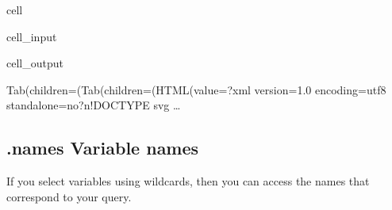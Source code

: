 \documentclass[letterpaper,10pt,english]{jupyterBook}
\begin{document}
\begin{sphinxuseclass}{cell}\begin{sphinxVerbatimInput}

\begin{sphinxuseclass}{cell_input}
\begin{sphinxVerbatim}[commandchars=\\\{\}]
\PYG{p}{[}\PYG{p}{]}
\end{sphinxVerbatim}

\end{sphinxuseclass}\end{sphinxVerbatimInput}
\begin{sphinxVerbatimOutput}

\begin{sphinxuseclass}{cell_output}
\begin{sphinxVerbatim}[commandchars=\\\{\}]
Tab(children=(Tab(children=(HTML(value=\PYGZsq{}\PYGZlt{}?xml version=\PYGZdq{}1.0\PYGZdq{} encoding=\PYGZdq{}utf\PYGZhy{}8\PYGZdq{} standalone=\PYGZdq{}no\PYGZdq{}?\PYGZgt{}\PYGZbs{}n\PYGZlt{}!DOCTYPE svg …
\end{sphinxVerbatim}

\end{sphinxuseclass}\end{sphinxVerbatimOutput}

\end{sphinxuseclass}

\subsection{.names Variable names}
\label{\detokenize{content/notebooks/modelflow_features:names-variable-names}}
\sphinxAtStartPar
If you select variables using wildcards, then you can access the names that correspond to your query.
\end{document}
